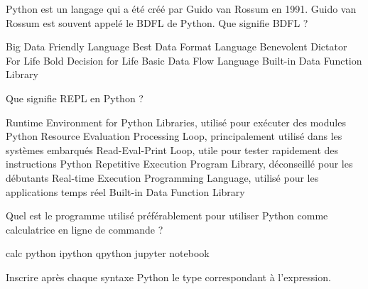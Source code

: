 \documentclass[french,a4paper,addpoints,11pt]{exam}
\begin{document}
\begin{questions}


    \question Python est un langage qui a été créé par Guido van Rossum en 1991. Guido van Rossum est souvent appelé le BDFL de Python. Que signifie BDFL ?

    \begin{multicols}{2}
        \begin{checkboxes}
            \choice Big Data Friendly Language
            \choice Best Data Format Language
            \CorrectChoice Benevolent Dictator For Life
            \choice Bold Decision for Life
            \choice Basic Data Flow Language
            \choice Built-in Data Function Library
        \end{checkboxes}
    \end{multicols}

    \question{} Que signifie REPL en Python ?

    \begin{checkboxes}
        \choice Runtime Environment for Python Libraries, utilisé pour exécuter des modules Python
        \choice Resource Evaluation Processing Loop, principalement utilisé dans les systèmes embarqués
        \CorrectChoice Read-Eval-Print Loop, utile pour tester rapidement des instructions Python
        \choice Repetitive Execution Program Library, déconseillé pour les débutants
        \choice Real-time Execution Programming Language, utilisé pour les applications temps réel
        \choice Built-in Data Function Library
    \end{checkboxes}

    \question

    Quel est le programme utilisé préférablement pour utiliser Python comme calculatrice en ligne de commande ?

    \begin{multicols}{3}
        \begin{checkboxes}
            \choice calc
            \choice python
            \CorrectChoice ipython
            \choice qpython
            \choice jupyter
            \choice notebook
        \end{checkboxes}
    \end{multicols}

    \question

    Inscrire après chaque syntaxe Python le type correspondant à l'expression.


\end{questions}
\end{document}
